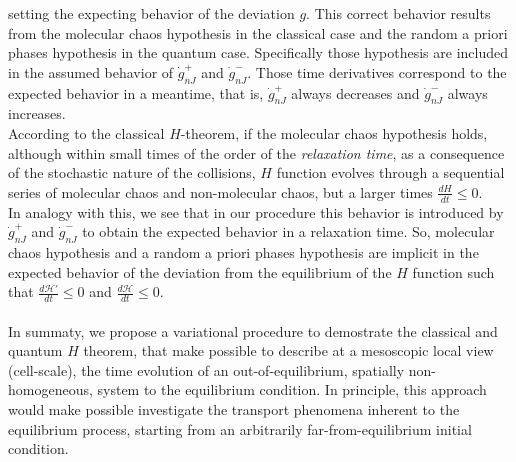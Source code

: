 setting the expecting behavior of the deviation $g$. 
This correct behavior results from the molecular chaos hypothesis in the classical case and 
the random a priori phases hypothesis in the quantum case. 
Specifically those hypothesis are included in the assumed behavior of $\dot{g}_{nJ}^{+}$ and $\dot{g}_{nJ}^{-}$. 
Those time derivatives correspond to the expected behavior in a meantime, that 
is, $\dot{g}_{nJ}^{+}$ always decreases and $\dot{g}_{nJ}^{-}$ always increases.\\ 
According to the classical $H$-theorem, if the molecular chaos hypothesis holds, 
although within small times of the order of the \textit{relaxation time}, as a consequence of the 
stochastic nature of the collisions, $H$ function evolves through a sequential series of 
molecular chaos and non-molecular chaos, but a larger times $\frac{dH}{dt}\leq 0$.\\
In analogy with this, we see that in our procedure this behavior is introduced by 
$\dot{g}_{nJ}^{+}$ and $\dot{g}_{nJ}^{-}$ to obtain the expected behavior in a relaxation time. 
So, molecular chaos hypothesis and a random a priori phases hypothesis are implicit
 in the expected behavior of the deviation from the equilibrium of the $H$ function such that 
$\frac{d\mathcal{H}'}{dt}\leq 0$ and $\frac{d\mathcal{H}}{dt}\leq 0$.
\\
\\
In summaty, we propose a variational procedure to demostrate the classical and quantum $H$ theorem, that
make possible to describe at a mesoscopic local view (cell-scale), the time evolution 
of an out-of-equilibrium, spatially non-homogeneous, system to the equilibrium condition.
In principle, this approach would make possible investigate the transport phenomena inherent to the
equilibrium process, starting from an arbitrarily far-from-equilibrium initial condition.


